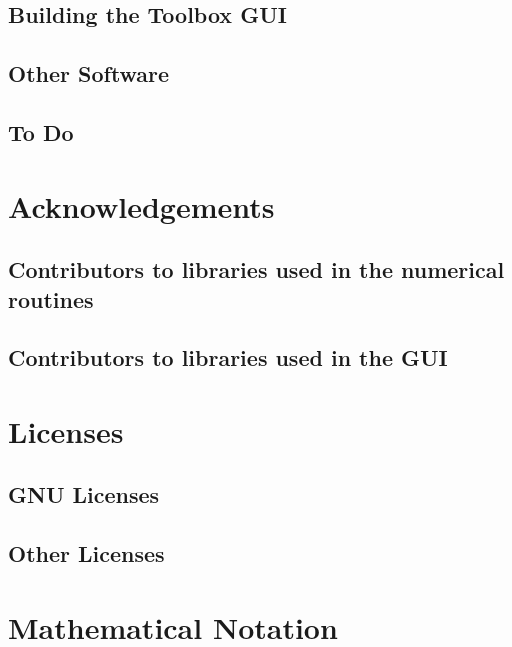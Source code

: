 \documentclass[12pt,a4paper,openany]{book}
\begin{document}
\section{Building the Toolbox GUI}

\section{Other Software}

\section{To Do}

\chapter{Acknowledgements}

\section{Contributors to libraries used in the numerical routines}

\section{Contributors to libraries used in the GUI}

\chapter{Licenses}

\section{GNU Licenses}

\section{Other Licenses}

\chapter{Mathematical Notation}

\chapter{\tocbibname }
\end{document}
